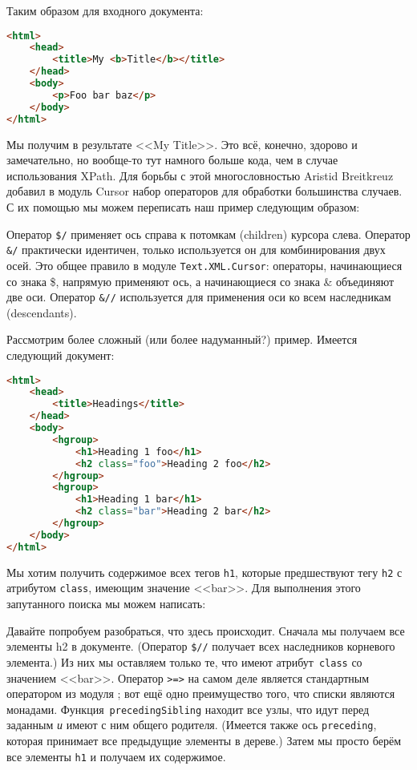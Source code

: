 Таким образом для входного документа:

\begin{lstlisting}[language=HTML]
<html>
    <head>
        <title>My <b>Title</b></title>
    </head>
    <body>
        <p>Foo bar baz</p>
    </body>
</html>
\end{lstlisting}

Мы получим в результате <<My Title>>. Это всё, конечно, здорово и замечательно,
но вообще-то тут намного больше кода, чем в случае использования XPath. Для
борьбы с этой многословностью Aristid Breitkreuz добавил в модуль Cursor набор
операторов для обработки большинства случаев. С их помощью мы можем переписать
наш пример следующим образом:


Оператор \lstinline!$/! применяет ось справа к потомкам (children) курсора
слева. Оператор \lstinline!&/! практически идентичен, только используется он
для комбинирования двух осей. Это общее правило в модуле
\lstinline!Text.XML.Cursor!: операторы, начинающиеся со знака \$, напрямую
применяют ось, а начинающиеся со знака \& объединяют две оси. Оператор
\lstinline!&//! используется для применения оси ко всем наследникам
(descendants).

Рассмотрим более сложный (или более надуманный?) пример. Имеется следующий
документ:

\begin{lstlisting}[language=HTML]
<html>
    <head>
        <title>Headings</title>
    </head>
    <body>
        <hgroup>
            <h1>Heading 1 foo</h1>
            <h2 class="foo">Heading 2 foo</h2>
        </hgroup>
        <hgroup>
            <h1>Heading 1 bar</h1>
            <h2 class="bar">Heading 2 bar</h2>
        </hgroup>
    </body>
</html>
\end{lstlisting}

Мы хотим получить содержимое всех тегов \lstinline!h1!, которые предшествуют
тегу \lstinline!h2! с атрибутом \lstinline!class!, имеющим значение <<bar>>.
Для выполнения этого запутанного поиска мы можем написать:


Давайте попробуем разобраться, что здесь происходит. Сначала мы получаем все
элементы h2 в документе. (Оператор \lstinline!$//! получает всех наследников
корневого элемента.) Из них мы оставляем только те, что имеют
атрибут~\lstinline!class! со значением <<bar>>. Оператор \lstinline!>=>! на
самом деле является стандартным оператором из модуля
;
вот ещё одно преимущество того, что списки являются монадами.
Функция~\lstinline!precedingSibling! находит все узлы, что идут перед заданным
\emph{и} имеют с ним общего родителя. (Имеется также ось \lstinline!preceding!,
которая принимает все предыдущие элементы в дереве.) Затем мы просто берём все
элементы \lstinline!h1! и получаем их содержимое.

